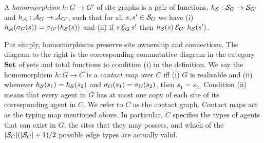 \begin{flushleft}
\begin{minipage}{.66\linewidth}
\begin{definition}
  A \emph{homomorphism} $h: G \to G'$ of site graphs is
  a pair of functions, $h_{\mathcal{S}}: \mathcal{S}_G \to \mathcal{S}_{G'}$
  and $h_{\mathcal{A}}: \mathcal{A}_G \to \mathcal{A}_{G'}$, such that
  for all $s,s' \in \mathcal{S}_G$ we have
  (i) $h_{\mathcal{A}}(\sigma_G(s)) = \sigma_{G'}(h_{\mathcal{S}}(s))$
  and (ii) if $s \mathbin{\mathcal{E}_G} s'$ then
  $h_{\mathcal{S}}(s) \mathbin{\mathcal{E}_{G'}} h_{\mathcal{S}}(s')$.
\end{definition}
\end{minipage}
\begin{minipage}{.3\linewidth}
\begin{flushright}
\end{flushright}
\end{minipage}
\end{flushleft}

Put simply, homomorphisms preserve site ownership and connections.
The diagram to the right is the corresponding
commutative diagram in the category $\mathbf{Set}$
of sets and total functions
to condition (i) in the definition.
We say the homomorphism $h: G \to C$ is
a \emph{contact map} over $C$ iff
(i) $G$ is realisable and
(ii) whenever $h_{\mathcal{S}}(s_1) = h_{\mathcal{S}}(s_2)$
and $\sigma_G(s_1) = \sigma_G(s_2)$, then $s_1 = s_2$.
Condition (ii) means that every agent in $G$ has at most
one copy of each site of its corresponding agent in $C$.
We refer to $C$ as the contact graph.
Contact maps act as the typing map mentioned above.
In particular,
$C$ specifies the types of agents that can exist in $G$,
the sites that they may possess,
and which of the $|\mathcal{S}_C|(|\mathcal{S}_C|+1)/2$
possible edge types are actually valid.

